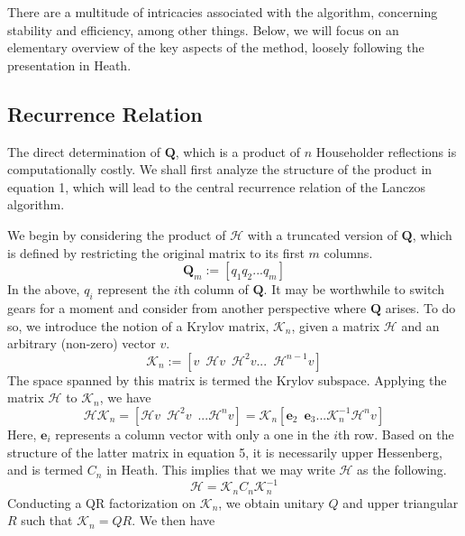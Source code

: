 \documentclass[12pt]{article} %
\begin{document}
There are a multitude of intricacies associated with the algorithm, concerning stability and efficiency, among other things. Below, we will focus on an elementary overview of the key aspects of the method, loosely following the presentation in Heath. \cite{doi:10.1137/1.9781611975581}

\subsection{Recurrence Relation}
The direct determination of $\textbf{Q}$, which is a product of $n$ Householder reflections is computationally costly. We shall first analyze the structure of the product in equation 1, which will lead to the central recurrence relation of the Lanczos algorithm.

We begin by considering the product of $\mathcal{H}$ with a truncated version of $\textbf{Q}$, which is defined by restricting the original matrix to its first $m$ columns.
\begin{equation}
    \textbf{Q}_m := [q_1 q_2 ... q_m]
\end{equation}
In the above, $q_i$ represent the $i$th column of  $\textbf{Q}$. It may be worthwhile to switch gears for a moment and consider from another perspective where $\textbf{Q}$ arises. To do so, we introduce the notion of a Krylov matrix, $\mathcal{K}_n$, given a matrix $\mathcal{H}$ and an arbitrary (non-zero) vector $v$.
\begin{equation}
    \mathcal{K}_n := [v \enspace \mathcal{H}v\enspace \mathcal{H}^2v ... \enspace \mathcal{H}^{n-1} v]
\end{equation}
The space spanned by this matrix is termed the Krylov subspace. Applying the matrix $\mathcal{H}$ to $\mathcal{K}_n$, we have
\begin{equation}
    \mathcal{H}\mathcal{K}_n = [\mathcal{H}v \enspace \mathcal{H}^2v \enspace ... \mathcal{H}^n v] = \mathcal{K}_n[\textbf{e}_2 \enspace \textbf{e}_3 ... \mathcal{K}_n^{-1} \mathcal{H}^n v]
\end{equation}
Here, $\textbf{e}_i$ represents a column vector with only a one in the $i$th row. Based on the structure of the latter matrix in equation 5, it is necessarily upper Hessenberg, and is termed $C_n$ in Heath. This implies that we may write $\mathcal{H}$ as the following.
\begin{equation}
    \mathcal{H} = \mathcal{K}_n C_n \mathcal{K}_n^{-1}
\end{equation}
Conducting a QR factorization on $\mathcal{K}_n$, we obtain unitary $Q$ and upper triangular $R$ such that $\mathcal{K}_n = QR$. We then have
\end{document}
